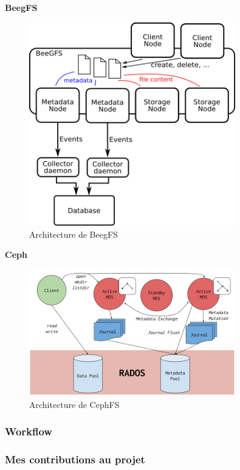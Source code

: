 \documentclass[a4paper,french,12pt, titlepage]{article}
\begin{document}
\textbf{BeegFS}

\begin{figure}[h]
\centering
\includegraphics[width=0.8\textwidth,height=0.8\textheight,keepaspectratio]{images/shema-beegfs.png}
\caption{Architecture de BeegFS}
\end{figure}

\textbf{Ceph}

\begin{figure}[h]
\centering
\includegraphics[width=0.8\textwidth,height=0.8\textheight,keepaspectratio]{images/shema-cephfs.png}
\caption{Architecture de CephFS}
\end{figure}

\hypertarget{workflow}{%
\subsubsection{Workflow}\label{workflow}}

\hypertarget{mes-contributions-au-projet}{%
\subsubsection{Mes contributions au
projet}\label{mes-contributions-au-projet}}
\end{document}
